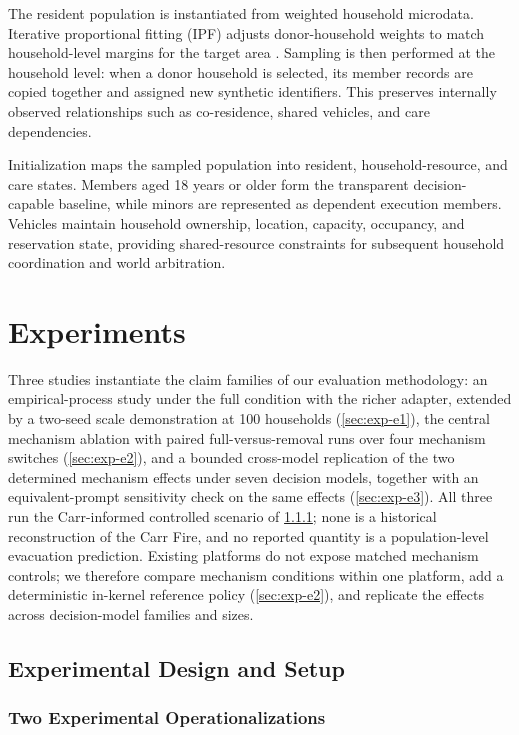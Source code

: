 \documentclass[journal]{IEEEtran}
\begin{document}
The resident population is instantiated from weighted household microdata.
Iterative proportional fitting (IPF) adjusts donor-household weights to match
household-level margins for the target area \cite{beckman1996synthetic,ye2009ipu}.
Sampling is then performed at the household level: when a donor household is
selected, its member records are copied together and assigned new synthetic
identifiers. This preserves internally observed relationships such as
co-residence, shared vehicles, and care dependencies.

Initialization maps the sampled population into resident, household-resource,
and care states. Members aged 18 years or older form the transparent
decision-capable baseline, while minors are represented as dependent execution
members. Vehicles maintain household ownership, location, capacity, occupancy,
and reservation state, providing shared-resource constraints for subsequent
household coordination and world arbitration.

\section{Experiments}
\label{sec:experiments}

Three studies instantiate the claim families of our evaluation methodology: an
empirical-process study under the full condition with the richer adapter,
extended by a two-seed scale demonstration at 100 households
(\cref{sec:exp-e1}), the central mechanism ablation with paired
full-versus-removal runs over four mechanism switches (\cref{sec:exp-e2}), and
a bounded cross-model replication of the two determined mechanism effects under
seven decision models, together with an equivalent-prompt sensitivity check on
the same effects (\cref{sec:exp-e3}). All three run the Carr-informed
controlled scenario of \cref{sec:adapters}; none is a historical reconstruction
of the Carr Fire, and no reported quantity is a population-level evacuation
prediction. Existing platforms do not expose matched mechanism controls; we
therefore compare mechanism conditions within one platform, add a
deterministic in-kernel reference policy (\cref{sec:exp-e2}), and replicate
the effects across decision-model families and sizes.

\subsection{Experimental Design and Setup}
\label{sec:evaluation-method}

\subsubsection{Two Experimental Operationalizations}
\label{sec:adapters}
\end{document}
